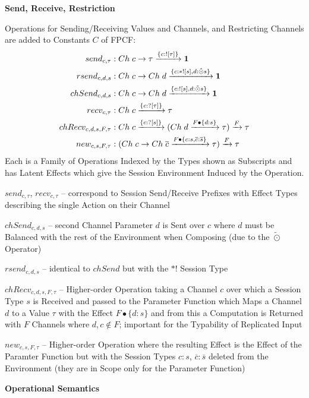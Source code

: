 \textbf{Send, Receive, Restriction}

Operations for Sending/Receiving Values and Channels, and Restricting
Channels are added to Constants $C$ of FPCF:
\begin{align*}
  send_{c,\tau} &:
    Ch\;c \rightarrow \tau \xrightarrow{\{c:![\tau]\}} \mathbf{1} \\
  rsend_{c,d,s} &:
    Ch\;c \rightarrow
      Ch\;d \xrightarrow{\{c:*![s],d:\tilde{\odot}s\}} \mathbf{1} \\
  chSend_{c,d,s} &:
    Ch\;c \rightarrow
      Ch\;d \xrightarrow{\{c:![s],d:\tilde{\odot}s\}} \mathbf{1} \\
  recv_{c,\tau} &: Ch\;c \xrightarrow{\{c:?[\tau]\}} \tau \\
  chRecv_{c,d,s,F,\tau} &:
    Ch\;c \xrightarrow{\{c:?[s]\}}
      (Ch\;d \xrightarrow{F \bullet \{d:s\}} \tau)
    \xrightarrow{F} \tau \\
  new_{c,s,F,\tau} &:
    (Ch\;c \rightarrow Ch\;\overline{c}
      \xrightarrow{F \bullet \{c:s,\overline{c}:\overline{s}\}} \tau)
    \xrightarrow{F} \tau
\end{align*}
Each is a Family of Operations Indexed by the Types shown as Subscripts
and has Latent Effects which give the Session Environment Induced by
the Operation.

$send_{c,\tau}$, $recv_{c,\tau}$ -- correspond to Session Send/Receive
Prefixes with Effect Types describing the single Action on their
Channel

$chSend_{c,d,s}$ -- second Channel Parameter $d$ is Sent over $c$
where $d$ must be Balanced with the rest of the Environment when
Composing (due to the $\tilde{\odot}$ Operator)

$rsend_{c,d,s}$ -- identical to $chSend$ but with the
$*!$ Session Type

$chRecv_{c,d,s,F,\tau}$ -- Higher-order Operation taking a Channel $c$
over which a Session Type $s$ is Received and passed to the Parameter
Function which Maps a Channel $d$ to a Value $\tau$ with the Effect $F
\bullet \{d:s\}$ and from this a Computation is Returned with $F$
Channels where $d,c \notin F$; important for the Typability of
Replicated Input

$new_{c,s,F,\tau}$ -- Higher-order Operation where the resulting
Effect is the Effect of the Paramter Function but with the Session
Types $c:s$, $\overline{c}:\overline{s}$ deleted from the Environment
(they are in Scope only for the Parameter Function) %


\textbf{Operational Semantics}

